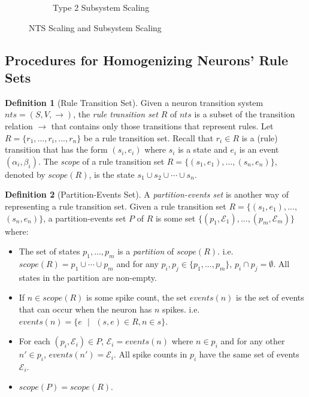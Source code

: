 \documentclass[]{elsarticle}
\theoremstyle{definition}
\newtheorem{definition2}{Definition}
\theoremstyle{definition}
\newcommand{\ra}{\rightarrow}
\newcommand{\ee}{\mathcal{E}}
\newcommand{\se}{\text{ }}
\begin{document}
\begin{figure}[H]
\begin{subfigure}{.49\textwidth}
      \caption{Type 2 Subsystem Scaling}
      \label{fig-nts-4b}
   \end{subfigure}
   \caption{NTS Scaling and Subsystem Scaling}
   \label{fig-nts-4}
\end{figure}

\subsection{Procedures for Homogenizing Neurons' Rule Sets}\label{sec-homo-algo}

\begin{definition2}[Rule Transition Set]
Given a neuron transition system $nts=(S,V,\ra)$, the \emph{rule transition set} $R$ of $nts$ is a
subset of the transition relation $\ra$ that contains only those transitions that represent rules.
Let $R=\{r_1,...,r_i,...,r_n\}$ be a rule transition set. Recall that $r_i \in R$ is a (rule) 
transition that has the form $(s_i,e_i)$ where $s_i$ is a state and $e_i$ is an event $(\alpha_i,
\beta_i)$. The \emph{scope} of a rule transition set $R=\{(s_1,e_1),...,(s_n,e_n)\}$, denoted by 
$scope(R)$, is the state $s_1 \cup s_2 \cup \cdots \cup s_n$.
\end{definition2}


\begin{definition2}[Partition-Events Set] 
A \emph{partition-events set} is another way of representing a rule transition set. Given a rule
transition set $R=\{(s_1,e_1),...,$ $(s_n,e_n)\}$, a partition-events set $P$ of $R$ is some set
$\{(p_1,\ee_1),...,(p_m,\ee_m)\}$ where:
\begin{itemize}
   \item The set of states $p_1,...,p_m$ is a \emph{partition} of $scope(R)$. i.e. $scope(R)=
         p_1 \cup \cdots \cup p_m$ and for any $p_i,p_j \in \{p_1,...,p_m\}$, $p_i 
         \cap p_j = \emptyset$. All states in the partition are non-empty.
   \item If $n \in scope(R)$ is some spike count, the set $events(n)$ is the set of events that can
         occur when the neuron has $n$ spikes. i.e. $events(n) = \{e\se|\se (s,e)\in R, n\in s\}$.
   \item For each $(p_i, \ee_i) \in P$, $\ee_i = events(n)$ where $n \in p_i$ and for any other 
         $n' \in p_i$, $events(n')=\ee_i$. All spike counts in $p_i$ have the same set of events
         $\ee_i$.
   \item $scope(P) = scope(R)$.
\end{itemize}
\end{definition2}
\end{document}
